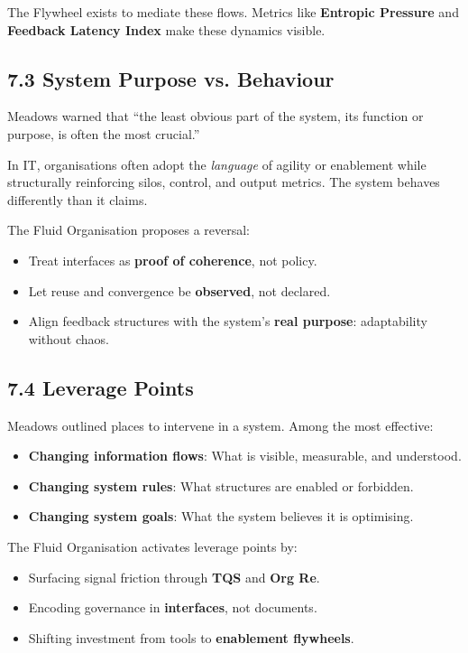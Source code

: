 \documentclass[12pt]{article}
\begin{document}
The Flywheel exists to mediate these flows. Metrics like \textbf{Entropic Pressure} and \textbf{Feedback Latency Index} make these dynamics visible.

\subsection*{7.3 System Purpose vs. Behaviour}

Meadows warned that “the least obvious part of the system, its function or purpose, is often the most crucial.”

In IT, organisations often adopt the \textit{language} of agility or enablement while structurally reinforcing silos, control, and output metrics. The system behaves differently than it claims.

The Fluid Organisation proposes a reversal:
\begin{itemize}
    \item Treat interfaces as \textbf{proof of coherence}, not policy.
    \item Let reuse and convergence be \textbf{observed}, not declared.
    \item Align feedback structures with the system’s \textbf{real purpose}: adaptability without chaos.
\end{itemize}

\subsection*{7.4 Leverage Points}

Meadows outlined places to intervene in a system. Among the most effective:
\begin{itemize}
    \item \textbf{Changing information flows}: What is visible, measurable, and understood.
    \item \textbf{Changing system rules}: What structures are enabled or forbidden.
    \item \textbf{Changing system goals}: What the system believes it is optimising.
\end{itemize}

The Fluid Organisation activates leverage points by:
\begin{itemize}
    \item Surfacing signal friction through \textbf{TQS} and \textbf{Org Re}.
    \item Encoding governance in \textbf{interfaces}, not documents.
    \item Shifting investment from tools to \textbf{enablement flywheels}.
\end{itemize}
\end{document}
